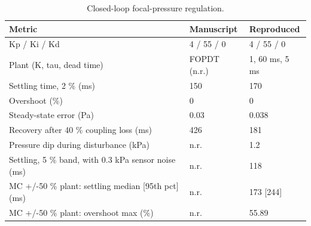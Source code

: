 \begin{table}
\caption{Closed-loop focal-pressure regulation.}
\label{tab:T_S10_control}
\begin{tabular}{lll}
\toprule
Metric & Manuscript & Reproduced \\
\midrule
Kp / Ki / Kd & 4 / 55 / 0 & 4 / 55 / 0 \\
Plant (K, tau, dead time) & FOPDT (n.r.) & 1, 60 ms, 5 ms \\
Settling time, 2 \% (ms) & 150 & 170 \\
Overshoot (\%) & 0 & 0 \\
Steady-state error (Pa) & 0.03 & 0.038 \\
Recovery after 40 \% coupling loss (ms) & 426 & 181 \\
Pressure dip during disturbance (kPa) & n.r. & 1.2 \\
Settling, 5 \% band, with 0.3 kPa sensor noise (ms) & n.r. & 118 \\
MC +/-50 \% plant: settling median [95th pct] (ms) & n.r. & 173 [244] \\
MC +/-50 \% plant: overshoot max (\%) & n.r. & 55.89 \\
\bottomrule
\end{tabular}
\end{table}
